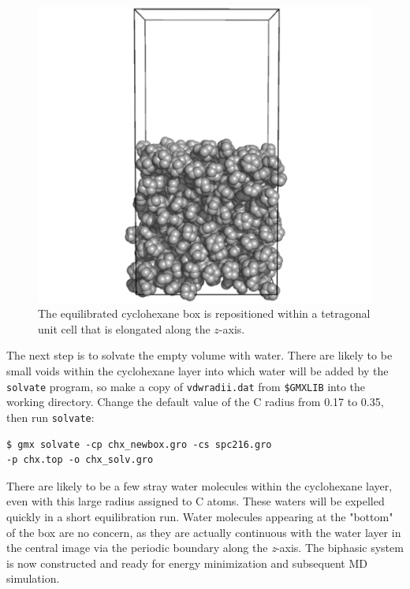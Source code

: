 \documentclass[9pt,tutorial]{livecoms}
\begin{document}
\begin{figure}[h!]
\centering
\includegraphics{biphasic_system_newbox}
\caption{The equilibrated cyclohexane box is repositioned within a tetragonal unit cell that is elongated along the $z$-axis.}
\label{biphasic_system_newbox_fig}
\end{figure}

The next step is to solvate the empty volume with water. There are likely to be small voids within the cyclohexane layer into which water will be added by the \texttt{solvate} program, so make a copy of \texttt{vdwradii.dat} from \texttt{\$GMXLIB} into the working directory. Change the default value of the C radius from 0.17 to 0.35, then run \texttt{solvate}:

\begin{verbatim}
$ gmx solvate -cp chx_newbox.gro -cs spc216.gro 
-p chx.top -o chx_solv.gro
\end{verbatim}

There are likely to be a few stray water molecules within the cyclohexane layer, even with this large radius assigned to C atoms. These waters will be expelled quickly in a short equilibration run. Water molecules appearing at the "bottom" of the box are no concern, as they are actually continuous with the water layer in the central image via the periodic boundary along the {\em z}-axis. The biphasic system is now constructed and ready for energy minimization and subsequent MD simulation.
\end{document}
